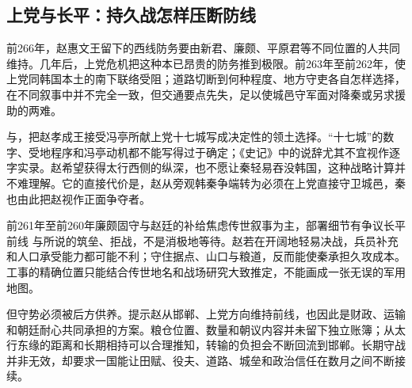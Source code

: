 \subsection{上党与长平：持久战怎样压断防线}

前266年，赵惠文王留下的西线防务要由新君、廉颇、平原君等不同位置的人共同维持。几年后，上党危机把这种本已昂贵的防务推到极限。前263年至前262年，使上党同韩国本土的南下联络受阻；道路切断到何种程度、地方守吏各自怎样选择，在不同叙事中并不完全一致，但交通要点先失，足以使城邑守军面对降秦或另求援助的两难。

与，把赵孝成王接受冯亭所献上党十七城写成决定性的领土选择。“十七城”的数字、受地程序和冯亭动机都不能写得过于确定；《史记》中的说辞尤其不宜视作逐字实录。赵希望获得太行西侧的纵深，也不愿让秦轻易吞没韩国，这种战略计算并不难理解。它的直接代价是，赵从旁观韩秦争端转为必须在上党直接守卫城邑，秦也由此把赵视作正面争夺者。

\begin{event}{前261年至前260年}{廉颇固守与赵廷的补给焦虑}{传世叙事为主，部署细节有争议}{长平前线}
与所说的筑垒、拒战，不是消极地等待。赵若在开阔地轻易决战，兵员补充和人口承受能力都可能不利；守住据点、山口与粮道，反而能使秦承担久攻成本。工事的精确位置只能结合传世地名和战场研究大致推定，不能画成一张无误的军用地图。

但守势必须被后方供养。提示赵从邯郸、上党方向维持前线，也因此是财政、运输和朝廷耐心共同承担的方案。粮仓位置、数量和朝议内容并未留下独立账簿；从太行东缘的距离和长期相持可以合理推知，转输的负担会不断回流到邯郸。长期守战并非无效，却要求一国能让田赋、役夫、道路、城垒和政治信任在数月之间不断接续。
\end{event}

